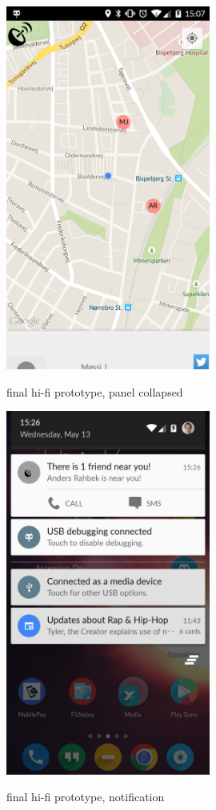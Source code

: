 \documentclass[runningheads,a4paper]{llncs}
\begin{document}
\begin{figure}
\centering
\caption{final hi-fi prototype, panel collapsed}
\includegraphics[width=0.6\textwidth]{figures/hi-fi-friendlist-collapsed}
\label{fig:hi-fi app friendlist collapsed}
\end{figure}

\begin{figure}
\centering
\caption{final hi-fi prototype, notification}
\includegraphics[width=0.6\textwidth]{figures/hi-fi-notification-app}
\label{fig:hi-fi app notification}
\end{figure}
\end{document}
